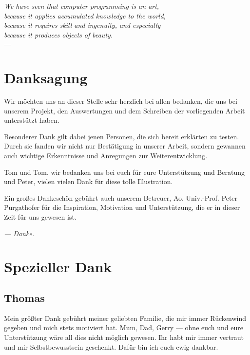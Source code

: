 
\begin{flushright}{\slshape    
    We have seen that computer programming is an art, \\ 
    because it applies accumulated knowledge to the world, \\ 
    because it requires skill and ingenuity, and especially \\
    because it produces objects of beauty.} \\ \medskip
    ---  \citep{knuth:1974}
\end{flushright}

\bigskip

\begingroup
\let\clearpage\relax
\let\cleardoublepage\relax
\let\cleardoublepage\relax
\chapter*{Danksagung}
Wir möchten uns an dieser Stelle sehr herzlich bei allen bedanken, die uns bei unserem Projekt, den Auswertungen und dem Schreiben der vorliegenden Arbeit unterstützt haben. 

Besonderer Dank gilt dabei jenen Personen, die sich bereit erklärten \scribbler zu testen. Durch sie fanden wir nicht nur Bestätigung in unserer Arbeit, sondern gewannen auch wichtige Erkenntnisse und Anregungen zur Weiterentwicklung.

Tom und Tom, wir bedanken uns bei euch für eure Unterstützung und Beratung und Peter, vielen vielen Dank für diese tolle Illustration.

Ein großes Dankeschön gebührt auch unserem Betreuer, Ao. Univ.-Prof. Peter Purgathofer für die Inspiration, Motivation und Unterstützung, die er in dieser Zeit für uns gewesen ist.

\medskip \noindent \emph{--- Danke.}

\pagebreak

\chapter*{Spezieller Dank}

\section*{Thomas}
Mein größter Dank gebührt meiner geliebten Familie, die mir immer Rückenwind gegeben und mich stets motiviert hat. Mum, Dad, Gerry --- ohne euch und eure Unterstützung wäre all dies nicht möglich gewesen. Ihr habt mir immer vertraut und mir Selbstbewusstsein geschenkt. Dafür bin ich euch ewig dankbar.

